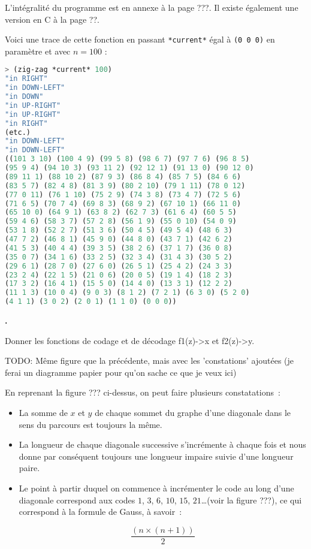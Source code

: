 \documentclass{article}
\newcounter{enoncecount}
\newenvironment{enonce}
{
\stepcounter{enoncecount}
\bf\small \arabic{enoncecount}.
\begin{bf}
}
{
\end{bf}
}
\begin{document}
L'intégralité du programme est en annexe à la page ???. Il existe également une version en C à la page ??.

Voici une trace de cette fonction en passant \lstinline!*current*! égal à \lstinline!(0 0 0)! en paramètre et avec $n = 100$ :

\begin{lstlisting}[language=Lisp]
> (zig-zag *current* 100)
"in RIGHT" 
"in DOWN-LEFT" 
"in DOWN" 
"in UP-RIGHT" 
"in UP-RIGHT" 
"in RIGHT" 
(etc.)
"in DOWN-LEFT" 
"in DOWN-LEFT" 
((101 3 10) (100 4 9) (99 5 8) (98 6 7) (97 7 6) (96 8 5) 
(95 9 4) (94 10 3) (93 11 2) (92 12 1) (91 13 0) (90 12 0) 
(89 11 1) (88 10 2) (87 9 3) (86 8 4) (85 7 5) (84 6 6) 
(83 5 7) (82 4 8) (81 3 9) (80 2 10) (79 1 11) (78 0 12) 
(77 0 11) (76 1 10) (75 2 9) (74 3 8) (73 4 7) (72 5 6) 
(71 6 5) (70 7 4) (69 8 3) (68 9 2) (67 10 1) (66 11 0) 
(65 10 0) (64 9 1) (63 8 2) (62 7 3) (61 6 4) (60 5 5) 
(59 4 6) (58 3 7) (57 2 8) (56 1 9) (55 0 10) (54 0 9) 
(53 1 8) (52 2 7) (51 3 6) (50 4 5) (49 5 4) (48 6 3) 
(47 7 2) (46 8 1) (45 9 0) (44 8 0) (43 7 1) (42 6 2) 
(41 5 3) (40 4 4) (39 3 5) (38 2 6) (37 1 7) (36 0 8) 
(35 0 7) (34 1 6) (33 2 5) (32 3 4) (31 4 3) (30 5 2) 
(29 6 1) (28 7 0) (27 6 0) (26 5 1) (25 4 2) (24 3 3) 
(23 2 4) (22 1 5) (21 0 6) (20 0 5) (19 1 4) (18 2 3) 
(17 3 2) (16 4 1) (15 5 0) (14 4 0) (13 3 1) (12 2 2) 
(11 1 3) (10 0 4) (9 0 3) (8 1 2) (7 2 1) (6 3 0) (5 2 0) 
(4 1 1) (3 0 2) (2 0 1) (1 1 0) (0 0 0))
\end{lstlisting}


\begin{enonce}
Donner les fonctions de codage et de décodage f1(z)->x et f2(z)->y.
\end{enonce}

TODO: Même figure que la précédente, mais avec les 'constations' ajoutées (je ferai un diagramme papier pour qu'on sache ce que je veux ici)

En reprenant la figure ??? ci-dessus, on peut faire plusieurs constatations~:

\begin{itemize}
\item La somme de $x$ et $y$ de chaque sommet du graphe d'une diagonale dans le sens du parcours est toujours la même.
\item La longueur de chaque diagonale successive s'incrémente à chaque fois et nous donne par conséquent toujours une longueur impaire suivie d'une longueur paire.
\item Le point à partir duquel on commence à incrémenter le code au long d'une diagonale correspond aux codes $1$, $3$, $6$, $10$, $15$, $21$\ldots (voir la figure ???), ce qui correspond à la formule de Gauss, à savoir~:

$$\dfrac{(n \times (n + 1))}{2}$$
\end{itemize}
\end{document}
